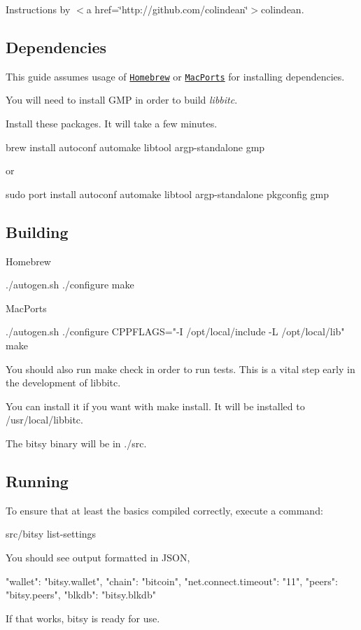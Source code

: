 Instructions by $<$a href=\char`\"{}http\-://github.\-com/colindean\char`\"{}$>$colindean.

\subsection*{Dependencies }

This guide assumes usage of \href{http://brew.sh}{\tt Homebrew} or \href{https://www.macports.org}{\tt Mac\-Ports} for installing dependencies.

You will need to install {\ttfamily G\-M\-P} in order to build {\itshape libbitc}.

Install these packages. It will take a few minutes. \begin{DoxyVerb}brew install autoconf automake libtool argp-standalone gmp
\end{DoxyVerb}


or \begin{DoxyVerb}sudo port install autoconf automake libtool argp-standalone pkgconfig gmp
\end{DoxyVerb}


\subsection*{Building }

Homebrew \begin{DoxyVerb}./autogen.sh
./configure
make
\end{DoxyVerb}


Mac\-Ports \begin{DoxyVerb}./autogen.sh
./configure CPPFLAGS="-I /opt/local/include -L /opt/local/lib"
make
\end{DoxyVerb}


You should also run {\ttfamily make check} in order to run tests. This is a vital step early in the development of {\ttfamily libbitc}.

You can install it if you want with {\ttfamily make install}. It will be installed to {\ttfamily /usr/local/libbitc}.

The {\ttfamily bitsy} binary will be in {\ttfamily ./src}.

\subsection*{Running }

To ensure that at least the basics compiled correctly, execute a command\-: \begin{DoxyVerb}src/bitsy list-settings
\end{DoxyVerb}


You should see output formatted in J\-S\-O\-N, \begin{DoxyVerb}{
  "wallet": "bitsy.wallet",
  "chain": "bitcoin",
  "net.connect.timeout": "11",
  "peers": "bitsy.peers",
  "blkdb": "bitsy.blkdb"
}
\end{DoxyVerb}


If that works, {\ttfamily bitsy} is ready for use. 